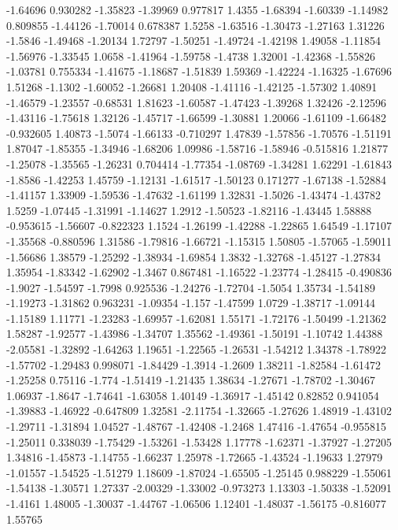 \documentclass[9pt]{article}
\theoremstyle{plain}
\theoremstyle{definition}
\theoremstyle{remark}
\numberwithin{equation}{section}
\begin{document}
-1.64696
0.930282
-1.35823
-1.39969
0.977817
1.4355
-1.68394
-1.60339
-1.14982
0.809855
-1.44126
-1.70014
0.678387
1.5258
-1.63516
-1.30473
-1.27163
1.31226
-1.5846
-1.49468
-1.20134
1.72797
-1.50251
-1.49724
-1.42198
1.49058
-1.11854
-1.56976
-1.33545
1.0658
-1.41964
-1.59758
-1.4738
1.32001
-1.42368
-1.55826
-1.03781
0.755334
-1.41675
-1.18687
-1.51839
1.59369
-1.42224
-1.16325
-1.67696
1.51268
-1.1302
-1.60052
-1.26681
1.20408
-1.41116
-1.42125
-1.57302
1.40891
-1.46579
-1.23557
-0.68531
1.81623
-1.60587
-1.47423
-1.39268
1.32426
-2.12596
-1.43116
-1.75618
1.32126
-1.45717
-1.66599
-1.30881
1.20066
-1.61109
-1.66482
-0.932605
1.40873
-1.5074
-1.66133
-0.710297
1.47839
-1.57856
-1.70576
-1.51191
1.87047
-1.85355
-1.34946
-1.68206
1.09986
-1.58716
-1.58946
-0.515816
1.21877
-1.25078
-1.35565
-1.26231
0.704414
-1.77354
-1.08769
-1.34281
1.62291
-1.61843
-1.8586
-1.42253
1.45759
-1.12131
-1.61517
-1.50123
0.171277
-1.67138
-1.52884
-1.41157
1.33909
-1.59536
-1.47632
-1.61199
1.32831
-1.5026
-1.43474
-1.43782
1.5259
-1.07445
-1.31991
-1.14627
1.2912
-1.50523
-1.82116
-1.43445
1.58888
-0.953615
-1.56607
-0.822323
1.1524
-1.26199
-1.42288
-1.22865
1.64549
-1.17107
-1.35568
-0.880596
1.31586
-1.79816
-1.66721
-1.15315
1.50805
-1.57065
-1.59011
-1.56686
1.38579
-1.25292
-1.38934
-1.69854
1.3832
-1.32768
-1.45127
-1.27834
1.35954
-1.83342
-1.62902
-1.3467
0.867481
-1.16522
-1.23774
-1.28415
-0.490836
-1.9027
-1.54597
-1.7998
0.925536
-1.24276
-1.72704
-1.5054
1.35734
-1.54189
-1.19273
-1.31862
0.963231
-1.09354
-1.157
-1.47599
1.0729
-1.38717
-1.09144
-1.15189
1.11771
-1.23283
-1.69957
-1.62081
1.55171
-1.72176
-1.50499
-1.21362
1.58287
-1.92577
-1.43986
-1.34707
1.35562
-1.49361
-1.50191
-1.10742
1.44388
-2.05581
-1.32892
-1.64263
1.19651
-1.22565
-1.26531
-1.54212
1.34378
-1.78922
-1.57702
-1.29483
0.998071
-1.84429
-1.3914
-1.2609
1.38211
-1.82584
-1.61472
-1.25258
0.75116
-1.774
-1.51419
-1.21435
1.38634
-1.27671
-1.78702
-1.30467
1.06937
-1.8647
-1.74641
-1.63058
1.40149
-1.36917
-1.45142
0.82852
0.941054
-1.39883
-1.46922
-0.647809
1.32581
-2.11754
-1.32665
-1.27626
1.48919
-1.43102
-1.29711
-1.31894
1.04527
-1.48767
-1.42408
-1.2468
1.47416
-1.47654
-0.955815
-1.25011
0.338039
-1.75429
-1.53261
-1.53428
1.17778
-1.62371
-1.37927
-1.27205
1.34816
-1.45873
-1.14755
-1.66237
1.25978
-1.72665
-1.43524
-1.19633
1.27979
-1.01557
-1.54525
-1.51279
1.18609
-1.87024
-1.65505
-1.25145
0.988229
-1.55061
-1.54138
-1.30571
1.27337
-2.00329
-1.33002
-0.973273
1.13303
-1.50338
-1.52091
-1.4161
1.48005
-1.30037
-1.44767
-1.06506
1.12401
-1.48037
-1.56175
-0.816077
1.55765
\end{document}
